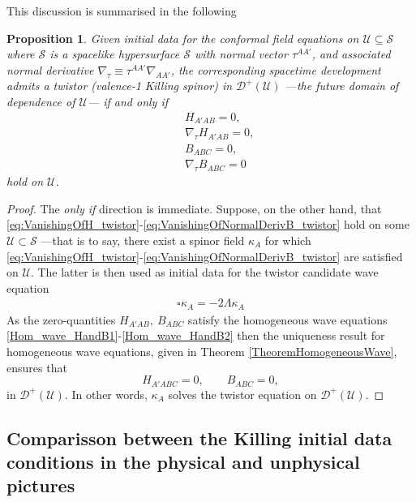 \documentclass[10pt,a4paper]{article}
\theoremstyle{plain}
\newtheorem{proposition}{Proposition}
\begin{document}
{This discussion is summarised in the following
\begin{proposition}\label{Prop:Propagation_twistor}
  Given initial data for the conformal field equations on $\mathcal{U}\subseteq\mathcal{S}$
  where $\mathcal{S}$ is a spacelike
hypersurface $\mathcal{S}$ with normal vector $\tau^{AA'}$, and
associated normal derivative $\nabla_\tau \equiv
\tau^{AA'}\nabla_{AA'}$, the corresponding spacetime development
admits a twistor (valence-1 Killing spinor) in $\mathcal{D}^{+}(\mathcal{U})$ ---the future domain of dependence of $\mathcal{U}$---  if and only if
\begin{subequations}
\begin{eqnarray}
  && H_{A'AB}=0,\label{eq:VanishingOfH_twistor}\\ && \nabla_\tau
  H_{A'AB}=0,\label{eq:VanishingOfNormalDerivH_twistor}\\ &&
  B_{ABC}=0,\label{eq:VanishingOfB_twistor}\\ &&\nabla_\tau
  B_{ABC}=0 \label{eq:VanishingOfNormalDerivB_twistor}
\end{eqnarray}
\end{subequations}
 hold on $\mathcal{U}$.
\end{proposition}
\begin{proof}
The \emph{only if} direction is immediate. Suppose, on the other hand,
that
\eqref{eq:VanishingOfH_twistor}-\eqref{eq:VanishingOfNormalDerivB_twistor}
hold on some $\mathcal{U}\subset\mathcal{S}$ ---that is to say, there
exist a spinor field $\kappa_{A}$ for which
\eqref{eq:VanishingOfH_twistor}-\eqref{eq:VanishingOfNormalDerivB_twistor}
are satisfied on $\mathcal{U}$. The latter is then used as initial
data for the twistor candidate wave equation
\begin{align} \label{Wave_eq_twistor_candidate_prop}
\square \kappa _{A} = -2 \Lambda \kappa _{A}
\end{align}
As the zero-quantities $H_{A'AB},~B_{ABC}$ satisfy the homogeneous
wave equations \eqref{Hom_wave_HandB1}-\eqref{Hom_wave_HandB2} then
the uniqueness result for homogeneous wave equations, given in
Theorem \ref{TheoremHomogeneousWave},
ensures that
\[ H_{A'ABC}=0,\qquad B_{ABC}=0,\]
in $\mathcal{D}^{+}(\mathcal{U})$. In other words,
$\kappa_{A}$ solves the twistor equation on $\mathcal{D}^{+}(\mathcal{U})$.
\end{proof}


\subsection{Comparisson between the Killing initial data conditions
  in the physical and unphysical pictures}

}
\end{document}
